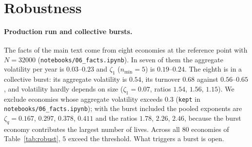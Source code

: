 \documentclass[pre,onecolumn,superscriptaddress,nofootinbib]{revtex4-2}
\begin{document}
\section{Robustness}
\label{sec:robust}

\paragraph{Production run and collective bursts.}  The facts of the main text come from eight economies
at the reference point with $N=32000$ (\texttt{notebooks/06\_facts.ipynb}).  In seven of them the aggregate
volatility per year is $0.03$--$0.23$ and $\zeta_1$ ($n_{\min}=5$) is $0.19$--$0.24$.  The eighth is in a
collective burst: its aggregate volatility is $0.54$, its turnover $0.68$ against $0.56$--$0.65$, and
volatility hardly depends on size ($\zeta_1=0.07$, ratios $1.54$, $1.56$, $1.15$).  We exclude economies
whose aggregate volatility exceeds $0.3$ (\texttt{kept} in \texttt{notebooks/06\_facts.ipynb}); with the burst included the pooled
exponents are $\zeta_q=0.167$, $0.297$, $0.378$, $0.411$ and the ratios $1.78$, $2.26$, $2.46$, because the burst
economy contributes the largest number of lives.  Across all $80$ economies of
Table~\ref{tab:robust}, $5$ exceed the threshold.  What triggers a burst is open.
\end{document}
